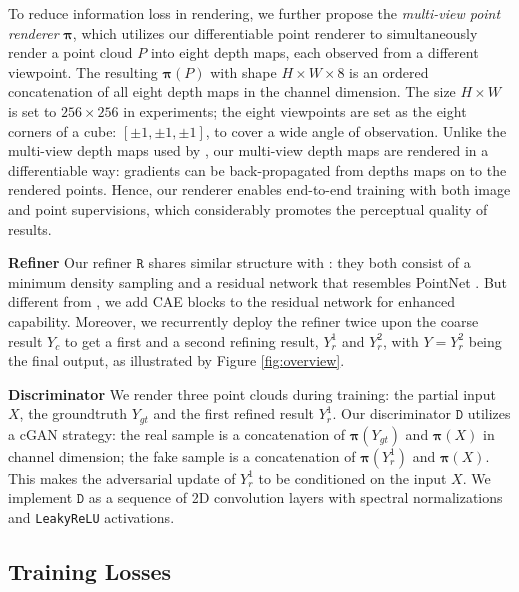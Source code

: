 \documentclass[final]{cvpr}
\begin{document}
To reduce information loss in rendering, we further propose the \emph{multi-view point renderer} $\bm{\pi}$, which utilizes our differentiable point renderer to simultaneously render a point cloud $P$ into eight depth maps, each observed from a different viewpoint. 
The resulting $\bm{\pi}(P)$ with shape $H\times W \times 8$ is an ordered concatenation of all eight depth maps in the channel dimension. 
The size $H\times W$ is set to $256\times 256$ in experiments; the eight viewpoints are set as the eight corners of a cube: $[\pm1,\pm1,\pm1]$, to cover a wide angle of observation. 
Unlike the multi-view depth maps used by \cite{hu2019render4completion}, our multi-view depth maps are rendered in a differentiable way: gradients can be back-propagated from depths maps on to the rendered points. Hence, our renderer enables end-to-end training with both image and point supervisions, which considerably promotes the perceptual quality of results.



\noindent\textbf{Refiner}
Our refiner $\mathtt{R}$ shares similar structure with \cite{liu2019morphing}: they both consist of a minimum density sampling and a residual network that resembles PointNet \cite{qi2017pointnet}. But different from \cite{liu2019morphing}, we add CAE blocks to the residual network for enhanced capability. Moreover, we recurrently deploy the refiner twice upon the coarse result $Y_c$ to get a first and a second refining result, $Y_r^1$ and $Y_r^2$, with $Y=Y_r^2$ being the final output, as illustrated by Figure \ref{fig:overview}.






\noindent\textbf{Discriminator}
We render three point clouds during training: the partial input $X$, the groundtruth $Y_{gt}$ and the first refined result $Y_r^1$. Our discriminator $\mathtt{D}$ utilizes a cGAN \cite{mirza2014conditional} strategy: the real sample is a concatenation of $\bm{\pi}(Y_{gt})$ and $\bm{\pi}(X)$ in channel dimension; the fake sample is a concatenation of $\bm{\pi}(Y_r^1)$ and $\bm{\pi}(X)$. This makes the adversarial update of $Y_r^1$ to be conditioned on the input $X$.
We implement $\mathtt{D}$ as a sequence of 2D convolution layers with spectral normalizations \cite{miyato2018spectral} and \texttt{LeakyReLU} activations. 




\subsection{Training Losses}
\end{document}
